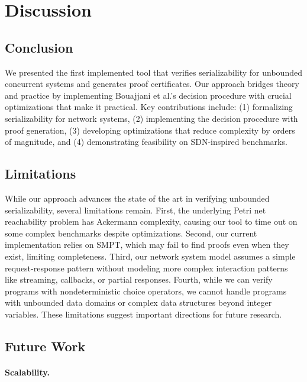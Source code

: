 \section{Discussion}
\label{sec:discussion}

\subsection{Conclusion}

We presented the first implemented tool that verifies serializability for unbounded concurrent systems and generates proof certificates.
Our approach bridges theory and practice by implementing Bouajjani et al.'s decision procedure with crucial optimizations that make it practical.
%
Key contributions include: (1) formalizing serializability for network systems, (2) implementing the decision procedure with proof generation, (3) developing optimizations that reduce complexity by orders of magnitude, and (4) demonstrating feasibility on SDN-inspired benchmarks.

%

\subsection{Limitations}

While our approach advances the state of the art in verifying unbounded serializability, several limitations remain.
First, the underlying Petri net reachability problem has Ackermann complexity, causing our tool to time out on some complex benchmarks despite optimizations.
Second, our current implementation relies on SMPT, which may fail to find proofs even when they exist, limiting completeness.
Third, our network system model assumes a simple request-response pattern without modeling more complex interaction patterns like streaming, callbacks, or partial responses.
Fourth, while we can verify programs with nondeterministic choice operators, we cannot handle programs with unbounded data domains or complex data structures beyond integer variables.
These limitations suggest important directions for future research.

\subsection{Future Work}

\paragraph{Scalability.}

